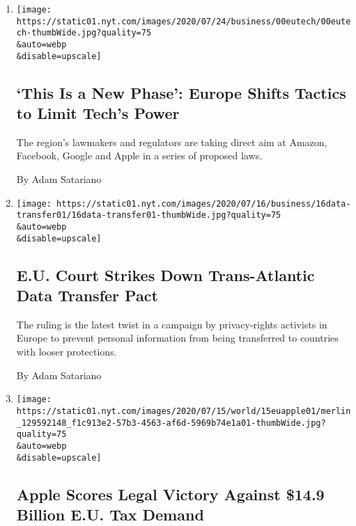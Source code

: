 \begin{enumerate}
\def\labelenumi{\arabic{enumi}.}
\item
  \href{/2020/07/30/technology/europe-new-phase-tech-amazon-apple-facebook-google.html}{}

  \texttt{[image: https://static01.nyt.com/images/2020/07/24/business/00eutech/00eutech-thumbWide.jpg?quality=75\\\&auto=webp\\\&disable=upscale]}

  \hypertarget{this-is-a-new-phase-europe-shifts-tactics-to-limit-techs-power}{%
  \subsection{`This Is a New Phase': Europe Shifts Tactics to Limit
  Tech's
  Power}\label{this-is-a-new-phase-europe-shifts-tactics-to-limit-techs-power}}

  The region's lawmakers and regulators are taking direct aim at Amazon,
  Facebook, Google and Apple in a series of proposed laws.

  By Adam Satariano
\item
  \href{/2020/07/16/business/eu-data-transfer-pact-rejected.html}{}

  \texttt{[image: https://static01.nyt.com/images/2020/07/16/business/16data-transfer01/16data-transfer01-thumbWide.jpg?quality=75\\\&auto=webp\\\&disable=upscale]}

  \hypertarget{eu-court-strikes-down-trans-atlantic-data-transfer-pact}{%
  \subsection{E.U. Court Strikes Down Trans-Atlantic Data Transfer
  Pact}\label{eu-court-strikes-down-trans-atlantic-data-transfer-pact}}

  The ruling is the latest twist in a campaign by privacy-rights
  activists in Europe to prevent personal information from being
  transferred to countries with looser protections.

  By Adam Satariano
\item
  \href{/2020/07/15/business/apple-eu-ireland-tax.html}{}

  \texttt{[image: https://static01.nyt.com/images/2020/07/15/world/15euapple01/merlin\_129592148\_f1c913e2-57b3-4563-af6d-5969b74e1a01-thumbWide.jpg?quality=75\\\&auto=webp\\\&disable=upscale]}

  \hypertarget{apple-scores-legal-victory-against-149-billion-eu-tax-demand}{%
  \subsection{Apple Scores Legal Victory Against \$14.9 Billion E.U. Tax
  Demand}\label{apple-scores-legal-victory-against-149-billion-eu-tax-demand}}


\end{enumerate}
